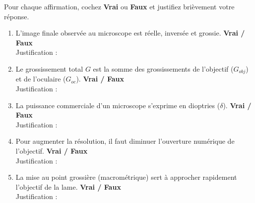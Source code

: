 \documentclass[11pt]{article}
\begin{document}
\begin{exercice}
\label{exo:vf}
Pour chaque affirmation, cochez \textbf{Vrai} ou \textbf{Faux} et justifiez brièvement votre réponse.
\begin{enumerate}
\item L'image finale observée au microscope est réelle, inversée et grossie. \hfill \textbf{Vrai / Faux} \\
Justification : \dotfill
\item Le grossissement total $G$ est la somme des grossissements de l'objectif ($G_{obj}$) et de l'oculaire ($G_{oc}$). \hfill \textbf{Vrai / Faux} \\
Justification : \dotfill
\item La puissance commerciale d'un microscope s'exprime en dioptries ($\delta$). \hfill \textbf{Vrai / Faux} \\
Justification : \dotfill
\item Pour augmenter la résolution, il faut diminuer l'ouverture numérique de l'objectif. \hfill \textbf{Vrai / Faux} \\
Justification : \dotfill
\item La mise au point grossière (macrométrique) sert à approcher rapidement l'objectif de la lame. \hfill \textbf{Vrai / Faux} \\
Justification : \dotfill
\end{enumerate}
\end{exercice}
\end{document}
